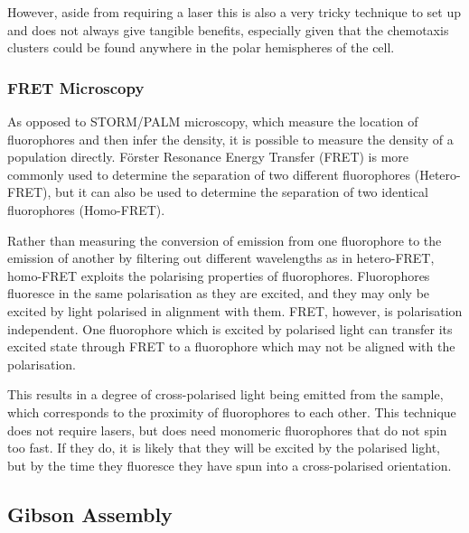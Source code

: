 \documentclass[../main.tex]{subfiles}
\begin{document}
However, aside from requiring a laser this is also a very tricky technique to set up and does not always give tangible benefits, especially given that the chemotaxis clusters could be found anywhere in the polar hemispheres of the cell.

\subsubsection{FRET Microscopy}
As opposed to STORM/PALM microscopy, which measure the location of fluorophores and then infer the density, it is possible to measure the density of a population directly. F\"orster Resonance Energy Transfer (FRET) is more commonly used to determine the separation of two different fluorophores (Hetero-FRET), but it can also be used to determine the separation of two identical fluorophores (Homo-FRET).

Rather than measuring the conversion of emission from one fluorophore to the emission of another by filtering out different wavelengths as in hetero-FRET, homo-FRET exploits the polarising properties of fluorophores. Fluorophores fluoresce in the same polarisation as they are excited, and they may only be excited by light polarised in alignment with them. FRET, however, is polarisation independent. One fluorophore which is excited by polarised light can transfer its excited state through FRET to a fluorophore which may not be aligned with the polarisation. 

This results in a degree of cross-polarised light being emitted from the sample, which corresponds to the proximity of fluorophores to each other. This technique does not require lasers, but does need monomeric fluorophores that do not spin too fast. If they do, it is likely that they will be excited by the polarised light, but by the time they fluoresce they have spun into a cross-polarised orientation.

\subsection{Gibson Assembly}
\end{document}
